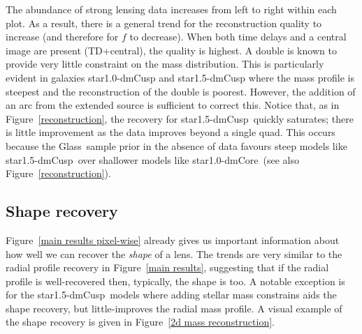 \documentclass[galley,usenatbib]{mn2e}
\newcommand{\Glass}{{\sc Glass}}
\newcommand{\figref}[1] {Figure~\ref{#1}}
\newcommand{\mockAA}{{\sc star1.0-dmCore}}
\newcommand{\mockAC}{{\sc star1.0-dmCusp}}
\newcommand{\mockBC}{{\sc star1.5-dmCusp}}
\begin{document}
The abundance of strong lensing data increases from left to right within each
plot. As a result, there is a general trend for the reconstruction quality to
increase (and therefore for $f$ to decrease). When both time delays and a
central image are present (TD+central), the quality is highest. A double is known to
provide very little constraint on the mass distribution. This is particularly
evident in galaxies \mockAC{} and \mockBC{} where the mass profile is steepest
and the reconstruction of the double is poorest. However, the addition of an
arc from the extended source is sufficient to correct this. Notice that, as in
\figref{reconstruction}, the recovery for \mockBC\ quickly saturates; there is
little improvement as the data improves beyond a single quad. This occurs
because the \Glass\ sample prior in the absence of data favours steep models
like \mockBC\ over shallower models like \mockAA\ (see also
\figref{reconstruction}). 

\subsection{Shape recovery}\label{sec:shape}

\figref{main results pixel-wise} already gives us important information about
how well we can recover the {\it shape} of a lens. The trends are very similar
to the radial profile recovery in \figref{main results}, suggesting that if the
radial profile is well-recovered then, typically, the shape is too. A notable
exception is for the \mockBC\ models where adding stellar mass constrains aids
the shape recovery, but little-improves the radial mass profile. A visual
example of the shape recovery is given in \figref{2d mass reconstruction}.
\end{document}
